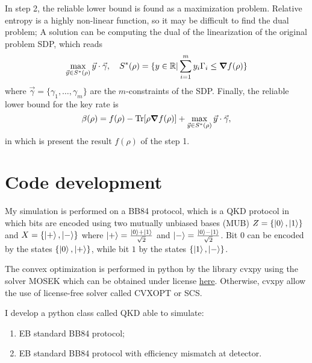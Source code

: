\documentclass{article}
\begin{document}
    In step 2, the reliable lower bound is found as a maximization problem.
    Relative entropy is a highly non-linear function, so it may be difficult to find the dual problem;
    A solution can be computing the dual of the linearization of the original problem SDP, which reads
    \[\max_{\vec{y}\in S^*(\rho)}\vec{y}\cdot\vec{\gamma}, \quad S^*(\rho)=\{y\in \mathbb{R}|\sum_{i=1}^my_i\Gamma_i\leq \grad f(\rho) \} \]
    where \(\vec{\gamma}=\{\gamma_1,\ldots,\gamma_m\}\) are the \(m\)-constraints of the SDP.
    Finally, the reliable lower bound for the key rate is 
    \[\beta(\rho)=f(\rho) - \Tr[\rho \grad f(\rho)] + \max_{\vec{y}\in S^*(\rho)}\vec{y}\cdot\vec{\gamma},\]
    in which is present the result \(f(\rho)\) of the step 1.

\section{Code development}
    My simulation is performed on a BB84 protocol, which is a QKD protocol in which bits are encoded using two mutually unbiased bases (MUB) \(Z=\{\ket{0}, \ket{1}\}\) and \(X=\{\ket{+},\ket{-}\}\) where \(\ket{+}=\frac{\ket{0}+\ket{1}}{\sqrt{2}}\) and \(\ket{-}=\frac{\ket{0}-\ket{1}}{\sqrt{2}}\).
    Bit \( 0 \) can be encoded by the states \( \{ \ket{0}, \ket{+} \} \), while bit \(1\) by the states \( \{ \ket{1}, \ket{-} \} \).

    The convex optimization is performed in python by the library \textrm{cvxpy} using the solver \textrm{MOSEK} which can be obtained under license \href{https://www.mosek.com/products/academic-licenses/}{here}.
    Otherwise, \textrm{cvxpy} allow the use of license-free solver called \textrm{CVXOPT} or \textrm{SCS}.

    I develop a python class called \textrm{QKD} able to simulate:
    \begin{enumerate}
        \item EB standard BB84 protocol;
        \item EB standard BB84 protocol with efficiency mismatch at detector.
    \end{enumerate}
\end{document}
